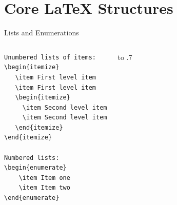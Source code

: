 \documentclass[aspectratio=1610]{beamer}
\begin{document}
\section{Core \LaTeX{} Structures}

\begin{frame}[fragile]{Lists and Enumerations}
  \begin{columns}[T]


\begin{lstlisting}
Unumbered lists of items:
\begin{itemize}
   \item First level item
   \item First level item
   \begin{itemize}
     \item Second level item
     \item Second level item
   \end{itemize}
\end{itemize}

Numbered lists:
\begin{enumerate}
    \item Item one
    \item Item two
\end{enumerate}
\end{lstlisting}


 \vbox to .7
  \end{columns}

\end{frame}
\end{document}
